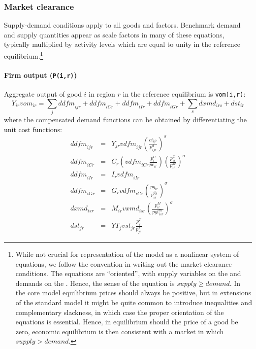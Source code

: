 \subsubsection{Market clearance}

Supply-demand conditions apply to all goods and factors.
Benchmark demand and supply quantities appear as scale factors in many of these equations, typically multiplied by activity levels which are equal to unity in the reference equilibrium.\footnote{While not crucial for representation of the model as a nonlinear system of equations, we follow the \MCP convention in writing out the market clearance conditions.
The equations are ``oriented'', with supply variables on the \LHS and demands on the \RHS.
Hence, the sense of the equation is $supply \geq demand$.
In the core model equilibrium prices should always be positive, but in extensions of the standard model it might be quite common to introduce inequalities and complementary slackness, in which case the proper orientation of the equations is essential.
Hence, in equilibrium should the price of a good be zero, economic equilibrium is then consistent with a market in which $supply > demand$.}

\paragraph{\bf Firm output (\texttt{P(i,r)})}

Aggregate output of good $i$ in region $r$ in the reference equilibrium is \texttt{vom(i,r)}:
\begin{equation}
\label{Youtput}
Y_{ir} \textit{vom}_{ir} =
\sum_j \textit{ddfm}_{ijr} + \textit{ddfm}_{iCr} + \textit{ddfm}_{iIr}
+ \textit{ddfm}_{iGr} + \sum_s \textit{dxmd}_{irs} + \textit{dst}_{ir}
\end{equation}
where the compensated demand functions can be obtained by differentiating the unit cost functions:
\begin{eqnarray}
\textit{ddfm}_{ijr} &=& Y_{jr} \textit{vdfm}_{ijr} \left( \frac{\textit{ci}_{ijr}}{p^d_{ijr}} \right)^\sigma \nonumber\\
\textit{ddfm}_{iCr}  &=& C_r \left( \textit{vdfm}_{iCr}\frac{p^C_r}{pc_{ir}} \right) \left(\frac{p^C_{ir}}{p^{\textit{dc}}_{ir}} \right)^\sigma \nonumber\\
\textit{ddfm}_{iIr}  &=& I_r \textit{vdfm}_{iIr} \nonumber\\
\textit{ddfm}_{iGr} &=& G_r \textit{vdfm}_{iGr}\left(\frac{pg_{ir}}{p^{\textit{dg}}_{ir}} \right)^\sigma   \nonumber\\
\textit{dxmd}_{isr} &=& M_{ir} \textit{vxmd}_{isr} \left(\frac{p^M_{ir}}{\textit{pyt}^m_{isr}} \right)^\sigma \nonumber\\
\textit{dst}_{jr} &=& \textit{YT}_j  \textit{vst}_{jr} \frac{p^T_j}{p^Y_{jr}}\nonumber
\end{eqnarray}

